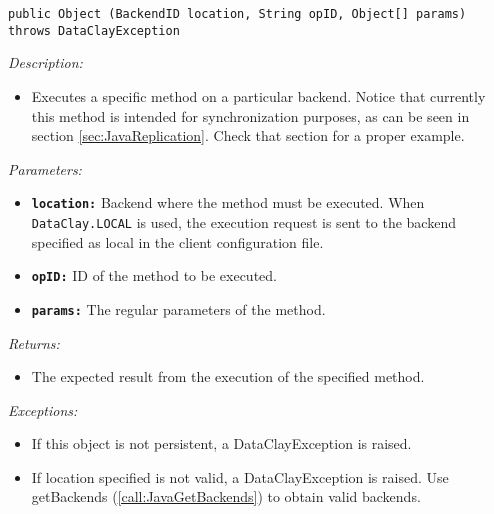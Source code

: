 \begin{dBox}
\texttt{public Object (BackendID location, \newline String opID, Object[] params) throws DataClayException}
\LINE

{\it Description:}

\begin{itemize}
    \item Executes a specific method on a particular backend. Notice that currently this method is intended for synchronization purposes, as can be seen in
  section \ref{sec:JavaReplication}. Check that section for a proper example.
\end{itemize}

{\it Parameters:}

\begin{itemize}
    \item \texttt{\bfseries location:} Backend where the method must be executed. When \texttt{DataClay.LOCAL} is used, the execution request is sent to the backend specified as local in the client configuration file.
    \item \texttt{\bfseries opID:} ID of the method to be executed.
    \item \texttt{\bfseries params:} The regular parameters of the method.
\end{itemize}
 
{\it Returns:}

\begin{itemize}
    \item The expected result from the execution of the specified method.
\end{itemize}

{\it Exceptions:}

\begin{itemize}
    \item If this object is not persistent, a DataClayException is raised.
    \item If location specified is not valid, a DataClayException is raised. Use getBackends (\ref{call:JavaGetBackends}) to obtain valid backends.
\end{itemize}

\end{dBox}






